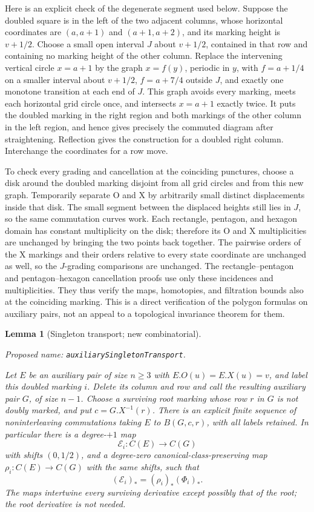 \documentclass[11pt,a4paper]{article}
\newtheorem{lemma}[theorem]{Lemma}
\theoremstyle{remark}
\newcommand{\formalname}[1]{\leavevmode\par\noindent\textnormal{\small Proposed name: \texttt{#1}.}\par\smallskip}
\begin{document}
Here is an explicit check of the degenerate segment used below.  Suppose
the doubled square is in the left of the two adjacent columns, whose
horizontal coordinates are $(a,a+1)$ and $(a+1,a+2)$, and its marking
height is $v+1/2$.  Choose a small open interval $J$ about $v+1/2$,
contained in that row and containing no marking height of the other
column.  Replace the intervening vertical circle $x=a+1$ by the graph
$x=f(y)$, periodic in $y$, with $f=a+1/4$ on a smaller interval about
$v+1/2$, $f=a+7/4$ outside $J$, and exactly one monotone transition at
each end of $J$.  This graph avoids every marking, meets each horizontal
grid circle once, and intersects $x=a+1$ exactly twice.  It puts the
doubled marking in the right region and both markings of the other
column in the left region, and hence gives precisely the commuted
diagram after straightening.  Reflection gives the construction for a
doubled right column.  Interchange the coordinates for a row move.

To check every grading and cancellation at the coinciding punctures,
choose a disk around the doubled marking disjoint from all grid circles
and from this new graph.  Temporarily separate O and X by arbitrarily
small distinct displacements inside that disk.  The small segment between
the displaced heights still lies in $J$, so the same commutation curves
work.  Each rectangle, pentagon, and hexagon domain has constant
multiplicity on the disk; therefore its O and X multiplicities are
unchanged by bringing the two points back together.  The pairwise orders
of the X markings and their orders relative to every state coordinate
are unchanged as well, so the $J$-grading comparisons are unchanged.
The rectangle--pentagon and pentagon--hexagon cancellation proofs use
only these incidences and multiplicities.  They thus verify the maps,
homotopies, and filtration bounds also at the coinciding marking.  This
is a direct verification of the polygon formulas on auxiliary pairs,
not an appeal to a topological invariance theorem for them.

\begin{lemma}[Singleton transport; new combinatorial]\label{lem:dummy-transport}
\formalname{auxiliarySingletonTransport}
Let $E$ be an auxiliary pair of size $n\ge3$ with
$E.O(u)=E.X(u)=v$, and label this doubled marking $i$.  Delete its column
and row and call the resulting auxiliary pair $G$, of size $n-1$.
Choose a surviving root marking whose row $r$ in $G$ is not doubly
marked, and put $c=G.X^{-1}(r)$.  There is an explicit finite sequence of
noninterleaving commutations taking $E$ to $B(G,c,r)$, with all labels
retained.  In particular there is a degree-$+1$ map
\[
 \mathcal E_i:C(E)\longrightarrow C(G)
\]
with shifts $(0,1/2)$, and a degree-zero canonical-class-preserving map
$\rho_i:C(E)\to C(G)$ with the same shifts, such that
\[
 (\mathcal E_i)_*=(\rho_i)_*(\Phi_i)_*.
\]
The maps intertwine every surviving derivative except possibly that of
the root; the root derivative is not needed.
\end{lemma}
\end{document}
